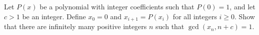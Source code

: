 Let $P(x)$ be a polynomial with integer coefficients such that $P(0)=1$, and let $c > 1$ be an integer. Define $x_0=0$ and $x_{i+1} = P(x_i)$ for all integers $i \ge 0$. Show that there are infinitely many positive integers $n$ such that $\gcd (x_n, n+c)=1$.

